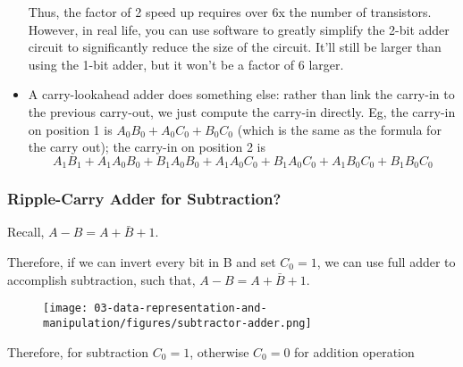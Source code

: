 \begin{frame}[fragile]
\begin{itemize}
{	Thus, the factor of 2 speed up requires over 6x the number of
	transistors.  However, in real life, you can use software to
	greatly simplify the 2-bit adder circuit to significantly
	reduce the size of the circuit.  It'll still be larger than using
	the 1-bit adder, but it won't be a factor of 6 larger.
	}
\item A carry-lookahead adder does something else: rather than link the
	carry-in to the previous carry-out, we just compute the carry-in
	directly.  Eg, the carry-in on position 1 is $A_0B_0+A_0C_{0}+B_0C_0$
	(which is the same as the formula for the carry out); the carry-in
	on position 2 is 
	\[
		A_1B_1+
		A_1A_0B_0 + B_1A_0B_0 + 
		A_1A_0C_0 + B_1A_0C_0 + 
		A_1B_0C_0 + B_1B_0C_0
	\]
	
\end{itemize}
\fi\ENotes
\end{frame}

\begin{frame}\frametitle{Ripple-Carry Adder for Subtraction?}

Recall, $ A - B = A + \bar{B} + 1 $. 

Therefore, if we can invert every bit in B and set $C_0=1$, we can use full adder to accomplish subtraction, such that,  $A - B = A + \bar{B} + 1$.

\begin{figure}[H]
\centering
	{\texttt{[image: 03-data-representation-and-manipulation/figures/subtractor-adder.png]}}
\end{figure}
Therefore, for subtraction $C_0 = 1$, otherwise $C_0 = 0$ for addition operation

\end{frame}




